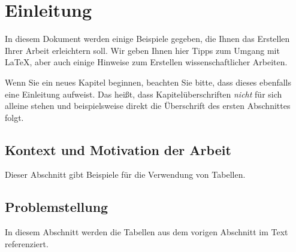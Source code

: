 \chapter{Einleitung}
\label{cha:Einleitung}

In diesem Dokument werden einige Beispiele gegeben, die Ihnen das Erstellen Ihrer Arbeit erleichtern soll. Wir geben Ihnen hier Tipps zum Umgang mit \LaTeX, aber auch einige Hinweise zum Erstellen wissenschaftlicher Arbeiten. 

Wenn Sie ein neues Kapitel beginnen, beachten Sie bitte, dass dieses ebenfalls eine Einleitung aufweist. Das heißt, dass Kapitelüberschriften \textit{nicht} für sich alleine stehen und beispielsweise direkt die Überschrift des ersten Abschnittes folgt.


\section{Kontext und Motivation der Arbeit}
\label{sec:kontext_motivation}
Dieser Abschnitt gibt Beispiele für die Verwendung von Tabellen.

\section{Problemstellung}
\label{sec:problemstellung}
In diesem Abschnitt werden die Tabellen aus dem vorigen Abschnitt im Text referenziert. 





